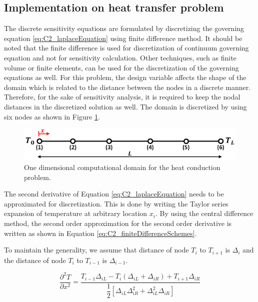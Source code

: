 \subsection{Implementation on heat transfer problem}
The discrete sensitivity equations are formulated by discretizing the governing equation \eqref{eq:C2_laplaceEquation} using finite difference method. It should be noted that the finite difference is used for discretization of continuum governing equation and not for sensitivity calculation. Other techniques, such as finite volume or finite elements, can be used for the discretization of the governing equations as well. For this problem, the design variable affects the shape of the domain which is related to the distance between the nodes in a discrete manner. Therefore, for the sake of sensitivity analysis, it is required to keep the nodal distances in the discretized solution as well. The domain is discretized by using six nodes as shown in Figure \ref{fig:C2_discretizedDomain}.

\begin{figure}[h]
    \centering
    \includegraphics[width=14.00cm]{Chapter_2/figure/benchmark_case_computational_domain.png}
    \caption{One dimensional computational domain for the heat conduction problem.}
    \label{fig:C2_discretizedDomain}
\end{figure}

The second derivative of Equation \eqref{eq:C2_laplaceEquation} needs to be approximated for discretization. This is done by writing the Taylor series expansion of temperature at arbitrary location $x_i$. By using the central difference method, the second order approximation for the second order derivative is written as shown in Equation \eqref{eq:C2_finiteDifferenceSchemes}.

To maintain the generality, we assume that distance of node $T_i$ to $T_{i+1}$ is $\Delta_i$ and the distance of node $T_i$ to $T_{i-1}$ is $\Delta_{i-1}$.

\begin{equation}\label{eq:C2_finiteDifferenceSchemes}
    \frac{\partial^2 T}{\partial x^2} = 
    \frac{T_{i-1} \Delta_{iL} - 
          T_{i} (\Delta_{iL} + \Delta_{iR}) + 
          T_{i+1} \Delta_{iR}}
         {\dfrac{1}{2} \left[ \Delta_{iL} \Delta_{iR}^2 + 
                             \Delta_{iL}^2 \Delta_{iR} \right]}
\end{equation}

